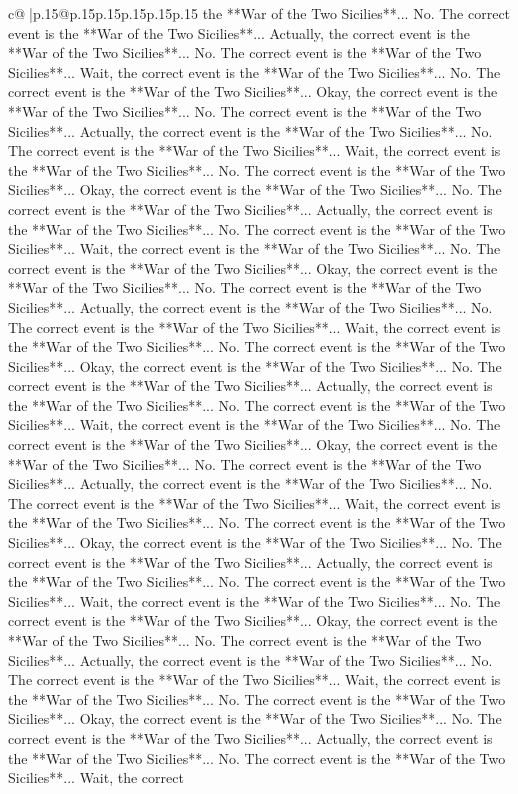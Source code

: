 \documentclass{article}
\begin{document}
{\begin{supertabular}{c@{$\;$}|p{.15\linewidth}@{}p{.15\linewidth}p{.15\linewidth}p{.15\linewidth}p{.15\linewidth}p{.15\linewidth}}
{{{the **War of the Two Sicilies**... No. The correct event is the **War of the Two Sicilies**... Actually, the correct event is the **War of the Two Sicilies**... No. The correct event is the **War of the Two Sicilies**... Wait, the correct event is the **War of the Two Sicilies**... No. The correct event is the **War of the Two Sicilies**... Okay, the correct event is the **War of the Two Sicilies**... No. The correct event is the **War of the Two Sicilies**... Actually, the correct event is the **War of the Two Sicilies**... No. The correct event is the **War of the Two Sicilies**... Wait, the correct event is the **War of the Two Sicilies**... No. The correct event is the **War of the Two Sicilies**... Okay, the correct event is the **War of the Two Sicilies**... No. The correct event is the **War of the Two Sicilies**... Actually, the correct event is the **War of the Two Sicilies**... No. The correct event is the **War of the Two Sicilies**... Wait, the correct event is the **War of the Two Sicilies**... No. The correct event is the **War of the Two Sicilies**... Okay, the correct event is the **War of the Two Sicilies**... No. The correct event is the **War of the Two Sicilies**... Actually, the correct event is the **War of the Two Sicilies**... No. The correct event is the **War of the Two Sicilies**... Wait, the correct event is the **War of the Two Sicilies**... No. The correct event is the **War of the Two Sicilies**... Okay, the correct event is the **War of the Two Sicilies**... No. The correct event is the **War of the Two Sicilies**... Actually, the correct event is the **War of the Two Sicilies**... No. The correct event is the **War of the Two Sicilies**... Wait, the correct event is the **War of the Two Sicilies**... No. The correct event is the **War of the Two Sicilies**... Okay, the correct event is the **War of the Two Sicilies**... No. The correct event is the **War of the Two Sicilies**... Actually, the correct event is the **War of the Two Sicilies**... No. The correct event is the **War of the Two Sicilies**... Wait, the correct event is the **War of the Two Sicilies**... No. The correct event is the **War of the Two Sicilies**... Okay, the correct event is the **War of the Two Sicilies**... No. The correct event is the **War of the Two Sicilies**... Actually, the correct event is the **War of the Two Sicilies**... No. The correct event is the **War of the Two Sicilies**... Wait, the correct event is the **War of the Two Sicilies**... No. The correct event is the **War of the Two Sicilies**... Okay, the correct event is the **War of the Two Sicilies**... No. The correct event is the **War of the Two Sicilies**... Actually, the correct event is the **War of the Two Sicilies**... No. The correct event is the **War of the Two Sicilies**... Wait, the correct event is the **War of the Two Sicilies**... No. The correct event is the **War of the Two Sicilies**... Okay, the correct event is the **War of the Two Sicilies**... No. The correct event is the **War of the Two Sicilies**... Actually, the correct event is the **War of the Two Sicilies**... No. The correct event is the **War of the Two Sicilies**... Wait, the correct }}}
\end{supertabular}}
\end{document}
